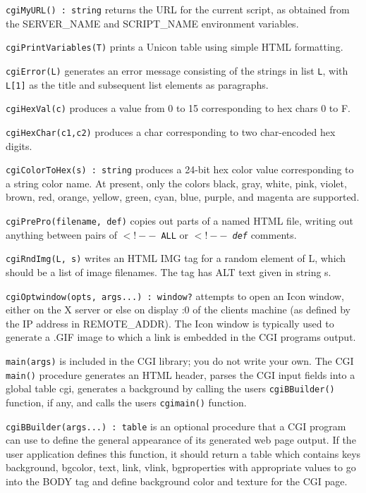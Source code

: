 \texttt{cgiMyURL() : string} returns the URL for the current script, as
obtained from the SERVER\_NAME and SCRIPT\_NAME environment variables. 

\texttt{cgiPrintVariables(T)} prints a Unicon table
using simple HTML formatting. 

\texttt{cgiError(L)} generates an error message consisting of the
strings in list \texttt{L}, with \texttt{L[1]} as the title and
subsequent list elements as paragraphs.

\texttt{cgiHexVal(c)} produces a value from 0 to 15 corresponding to
hex chars 0 to F. 

\texttt{cgiHexChar(c1,c2)} produces a char corresponding to
two char-encoded hex digits. 

\texttt{cgiColorToHex(s) : string} produces a 24-bit hex color value
corresponding to a string color name. At present, only the colors
black, gray, white, pink, violet, brown, red, orange, yellow, green,
cyan, blue, purple, and magenta are supported. 

\texttt{cgiPrePro(filename, def)} copies out parts of a
named HTML file, writing out anything between pairs of \texttt{$<!--$ ALL}
or \texttt{$<!--$ {\em def\/}} comments.

\texttt{cgiRndImg(L, s)} writes an HTML IMG tag for a random element of
L, which should be a list of image filenames. The tag has ALT text
given in string s. 

\texttt{cgiOptwindow(opts, args...) : window?} attempts to open an Icon
window, either on the X server or else on display :0 of the
client{\textquotesingle}s machine (as defined by the IP address in
REMOTE\_ADDR). The Icon window is typically used to generate a .GIF
image to which a link is embedded in the CGI
program{\textquotesingle}s output. 

\texttt{main(args)} is included in the CGI library; you do not write
your own. The CGI \texttt{main()} procedure generates an HTML header,
parses the CGI input fields into a global table cgi, generates a
background by calling the user{\textquotesingle}s
\texttt{cgiBBuilder()} function, if any, and calls the
user{\textquotesingle}s \texttt{cgimain()} function. 

\texttt{cgiBBuilder(args...) : table} is an optional procedure that a
CGI program can use to define the general appearance of its
generated web page output. If the user application defines this
function, it should return a table which contains keys
{\textquotedbl}background{\textquotedbl},
{\textquotedbl}bgcolor{\textquotedbl},
{\textquotedbl}text{\textquotedbl}, {\textquotedbl}link{\textquotedbl},
{\textquotedbl}vlink{\textquotedbl},
{\textquotedbl}bgproperties{\textquotedbl} with appropriate values to
go into the BODY tag and define background color and texture for the
CGI page. 

